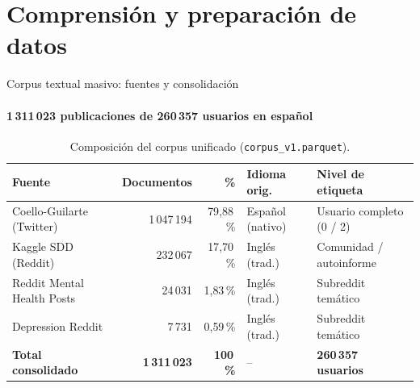 
\section{Comprensión y preparación de datos}

\begin{frame}{Corpus textual masivo: fuentes y consolidación}
  \framesubtitle{1\,311\,023 publicaciones de 260\,357 usuarios en español}

  \begin{table}
    \centering\small
    \setlength{\tabcolsep}{4pt}
    \caption{Composición del corpus unificado (\texttt{corpus\_v1.parquet}).}
    \begin{tabular}{lrrll}
      \toprule
      \textbf{Fuente} & \textbf{Documentos} & \textbf{\%} & \textbf{Idioma orig.} & \textbf{Nivel de etiqueta} \\
      \midrule
      Coello-Guilarte (Twitter) & 1\,047\,194 & 79{,}88\,\% & Español (nativo) & Usuario completo (0 / 2) \\
      Kaggle SDD (Reddit) & 232\,067 & 17{,}70\,\% & Inglés (trad.) & Comunidad / autoinforme \\
      Reddit Mental Health Posts & 24\,031 & 1{,}83\,\% & Inglés (trad.) & Subreddit temático \\
      Depression Reddit & 7\,731 & 0{,}59\,\% & Inglés (trad.) & Subreddit temático \\
      \midrule
      \textbf{Total consolidado} & \textbf{1\,311\,023} & \textbf{100\,\%} & -- & \textbf{260\,357 usuarios} \\
      \bottomrule
    \end{tabular}
  \end{table}

  \vskip0.05cm
  \begin{columns}[T]
  \end{columns}


\end{frame}
